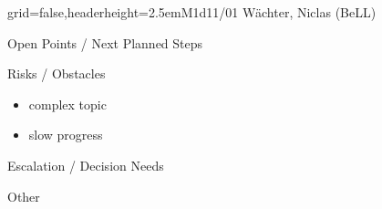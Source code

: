 \documentclass[english]{kiesgrube}
\begin{document}
\begin{poster}{grid=false,headerheight=2.5em}{}{M1d11/01 Wächter, Niclas (BeLL)}{}{}
\begin{posterbox}[name=open,column=1,below=description]{Open Points / Next Planned Steps}
\end{posterbox}
\begin{posterbox}[name=risks,column=1,below=open]{Risks / Obstacles}
\begin{itemize}
\item complex topic 
\item slow progress
\end{itemize}
\end{posterbox}
\begin{posterbox}[name=escalation,column=1,below=risks]{Escalation / Decision Needs}
\end{posterbox}
\begin{posterbox}[name=other,column=1,below=escalation]{Other}
\end{posterbox}
\footer{}
\end{poster}

\newpage
\end{document}
